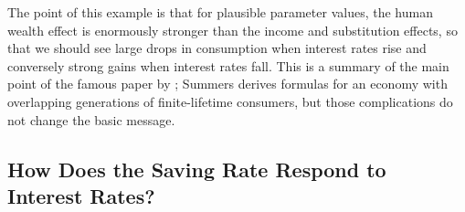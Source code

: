 The point of this example is that for plausible parameter values, the
human wealth effect is enormously stronger than the income and
substitution effects, so that we should see large drops in consumption
when interest rates rise and conversely strong gains when interest
rates fall.  This is a summary of the main point of the famous paper
by \cite{summersCapTax}; Summers derives formulas for an economy with
overlapping generations of finite-lifetime consumers, but those
complications do not change the basic message.

\subsection{How Does the Saving Rate Respond to Interest Rates?} %

